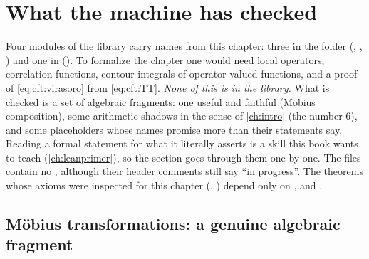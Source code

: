\section{What the machine has checked}\label{sec:cft:lean}

Four modules of the library  carry names from this chapter:
three in the folder  (, ,
) and one in  (). To
formalize the chapter one would need local operators, correlation functions, contour integrals of operator-valued functions, and a
proof of \eqref{eq:cft:virasoro} from \eqref{eq:cft:TT}. \emph{None of this is in the library.}
What is checked is a set of algebraic fragments: one useful and faithful (M\"obius composition),
some arithmetic shadows in the sense of \cref{ch:intro} (the number $6$), and some placeholders
whose names promise more than their statements say. Reading a formal statement for what it
literally asserts is a skill this book wants to teach (\cref{ch:leanprimer}), so the section goes
through them one by one. The files contain no , although their header comments still
say ``in progress''. The theorems whose axioms were inspected for this chapter
(, ) depend only on ,
 and .

\subsection{M\"obius transformations: a genuine algebraic fragment}

